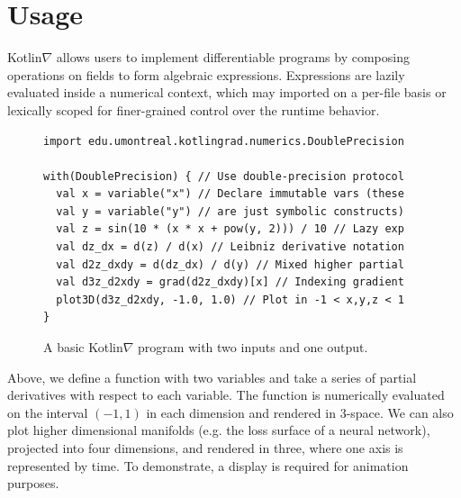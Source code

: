 \documentclass[12pt,initial,twoside,maitrise]{dms}
\numberwithin{equation}{section}
\numberwithin{table}{chapter}
\numberwithin{figure}{chapter}
\begin{document}
\section{Usage}

Kotlin$\nabla$ allows users to implement differentiable programs by composing operations on fields to form algebraic expressions. Expressions are lazily evaluated inside a numerical context, which may imported on a per-file basis or lexically scoped for finer-grained control over the runtime behavior.

\begin{figure}[!htb]
\begin{verbatim}
import edu.umontreal.kotlingrad.numerics.DoublePrecision

with(DoublePrecision) { // Use double-precision protocol
  val x = variable("x") // Declare immutable vars (these
  val y = variable("y") // are just symbolic constructs)
  val z = sin(10 * (x * x + pow(y, 2))) / 10 // Lazy exp
  val dz_dx = d(z) / d(x) // Leibniz derivative notation
  val d2z_dxdy = d(dz_dx) / d(y) // Mixed higher partial
  val d3z_d2xdy = grad(d2z_dxdy)[x] // Indexing gradient
  plot3D(d3z_d2xdy, -1.0, 1.0) // Plot in -1 < x,y,z < 1
}
\end{verbatim}

\caption{A basic Kotlin$\nabla$ program with two inputs and one output.}
\label{label:fig1}
\end{figure}

 Above, we define a function with two variables and take a series of partial derivatives with respect to each variable. The function is numerically evaluated on the interval $(-1, 1)$ in each dimension and rendered in 3-space. We can also plot higher dimensional manifolds (e.g. the loss surface of a neural network), projected into four dimensions, and rendered in three, where one axis is represented by time. To demonstrate, a display is required for animation purposes.
\end{document}
